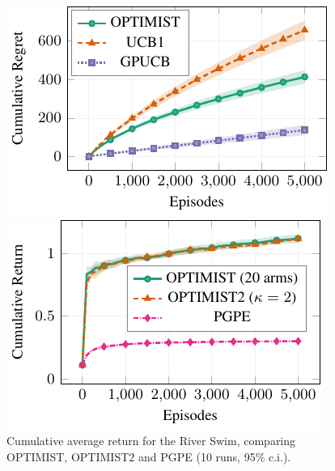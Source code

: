 \documentclass{article}
\makeatletter
\DeclareRobustCommand{\algoname}{OPTIMIST\@\xspace}
\makeatother
\begin{document}
\begin{figure}[t] 
\vskip 0.2in
  \begin{minipage}[b]{0.32\linewidth}
    \centering
    \vspace{-0.2cm}
    \includegraphics[width=\linewidth]{plots/lqg_mu/plot.pdf}
    \vspace{-0.5cm}
    \caption{Cumulative regret in the LQG experiment, comparing \algoname, UCB1 and GPUCB (30 runs, 95\% c.i.).} 
    \label{fig:lqg} 
  \end{minipage}%
  \hspace{0.2cm}
  \begin{minipage}[b]{0.32\linewidth}
    \centering
    \vspace{-0.2cm}
    \includegraphics[width=0.99\linewidth]{plots/riverswim/plot_main.pdf}
    \vspace{-0.5cm}
    \caption{Cumulative average return for the River Swim, comparing \algoname, OPTIMIST2 and PGPE (10 runs, 95\% c.i.).} 

\end{minipage}
\end{figure}
\end{document}
